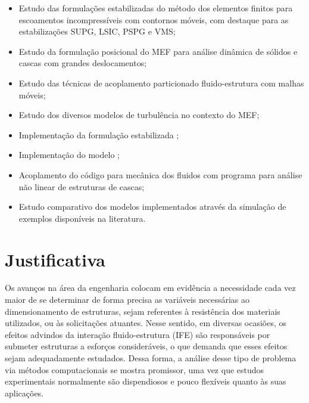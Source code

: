 \begin{itemize}
    \item Estudo das formulações estabilizadas do método dos elementos finitos para escoamentos incompressíveis com contornos móveis, com destaque para as estabilizações SUPG, LSIC, PSPG e VMS;

    \item Estudo da formulação posicional do MEF para análise dinâmica de sólidos e cascas com grandes deslocamentos;

    \item Estudo das técnicas de acoplamento particionado fluido-estrutura com malhas móveis;

    \item Estudo dos diversos modelos de turbulência no contexto do MEF;

    \item Implementação da formulação estabilizada \VMS;

    \item Implementação do modelo \LES;

    \item Acoplamento do código para mecânica dos fluidos com programa para análise não linear de estruturas de cascas;

    \item Estudo comparativo dos modelos implementados através da simulação de exemplos disponíveis na literatura.
\end{itemize}




\section{Justificativa}

Os avanços na área da engenharia colocam em evidência a necessidade cada vez maior de se determinar de forma precisa as variáveis necessárias ao dimensionamento de estruturas, sejam referentes à resistência dos materiais utilizados, ou às solicitações atuantes. Nesse sentido, em diversas ocasiões, os efeitos advindos da interação fluido-estrutura (IFE) são responsáveis por submeter estruturas a esforços consideráveis, o que demanda que esses efeitos sejam adequadamente estudados. Dessa forma, a análise desse tipo de problema via métodos computacionais se mostra promissor, uma vez que estudos experimentais normalmente são dispendiosos e pouco flexíveis quanto às suas aplicações.

